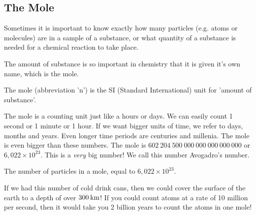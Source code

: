             \subsection*{The Mole}
            \nopagebreak
      \label{m38717*id275573}Sometimes it is important to know exactly how many particles (e.g. atoms or molecules) are in a sample of a substance, or what quantity of a substance is needed for a chemical reaction to take place.\par 
\label{m38717*eip-872}The amount of substance is so important in chemistry that it is given it's own name, which is the mole.  \par \label{m38717*fhsst!!!underscore!!!id119}\pagebreak
{} { \label{m38717*meaningfhsst!!!underscore!!!id119}
      \label{m38717*id275969}The mole (abbreviation 'n') is the SI (Standard International) unit for 'amount of substance'. \par 
       } 
The mole is a counting unit just like a hours or days. We can easily count 1 second or 1 minute or 1 hour. If we want bigger units of time, we refer to days, months and years. Even longer time periods are centuries and millenia. The mole is even bigger than these numbers. The mole is $602 ~204 ~500 ~000 ~000 ~000 ~000 ~000$ or $6,022 \times 10^{23}$. This is a \textsl{very} big number! We call this number Avogadro's number. \label{m38717*fhsst!!!underscore!!!id123}
 { \label{m38717*meaningfhsst!!!underscore!!!id123}
      \label{m38717*id276010}The number of particles in a mole, equal to $6,022\ensuremath{\times}{10}^{23}$. \par 
       } 
\label{m38717*eip-446}If we had this number of cold drink cans, then we could cover the surface of the earth to a depth of over $300\phantom{\rule{2pt}{0ex}}\text{km}$! If you could count atoms at a rate of 10 million per second, then it would take you 2 billion years to count the atoms in one mole!\par \label{m38717*notfhsst!!!underscore!!!id126}
